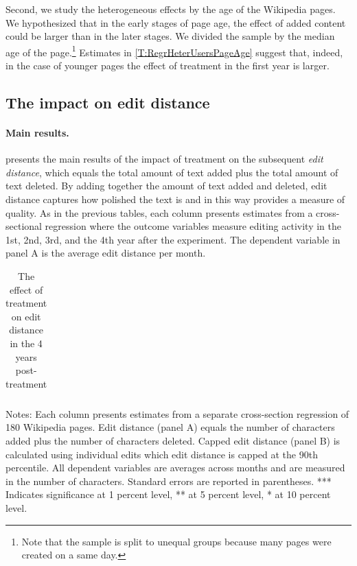 \documentclass[12pt]{article}
\begin{document}
Second, we study the heterogeneous effects by the age of the Wikipedia pages. We hypothesized that in the early stages of page age, the effect of added content could be larger than in the later stages. We divided the sample by the median age of the page.\footnote{Note that the sample is split to unequal groups because many pages were created on a same day.} Estimates in \cref{T:RegrHeterUsersPageAge} suggest that, indeed, in the case of  younger pages the effect of treatment in the first year is larger. 

\subsection{The impact on edit distance}

\paragraph{Main results.}
 presents the main results of the impact of treatment on the subsequent \emph{edit distance}, which equals the total amount of text added plus the total amount of text deleted. By adding together the amount of text added and deleted, edit distance captures how polished the text is and in this way provides a measure of quality.
As in the previous tables, each column presents estimates from a cross-sectional regression where the outcome variables measure editing activity in the 1st, 2nd, 3rd, and the 4th year after the experiment.
The dependent variable in panel A is the average edit distance per month. 

\begin{table}[h!]
\begin{center}
\caption{The effect of treatment on edit distance in the 4 years post-treatment}
\label{T:RegrEditDistCrossSection}
\renewcommand{\tabcolsep}{1pt}
\begin{tabular}{ l cc cc cc cc }
\hline

\hline
\end{tabular}
\end{center}
\footnotesize{
Notes: Each column presents estimates from a separate cross-section regression of 180 Wikipedia pages. Edit distance (panel A) equals the number of characters added plus the number of characters deleted. Capped edit distance (panel B) is calculated using individual edits which edit distance is capped at the 90th percentile. All dependent variables are averages across months and are measured in the number of characters.  Standard errors are reported in parentheses. *** Indicates significance at 1 percent level, ** at 5 percent level, * at 10 percent level.
}
\end{table}
\end{document}
